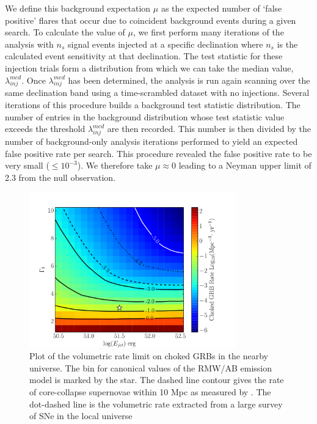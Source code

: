 \documentclass[manuscript]{aastex}
\begin{document}
We define this background expectation $\mu$ as the expected number of `false positive' flares that occur due to coincident background events during a given search. To calculate the value of $\mu$, we first perform many iterations of the analysis with $n_s$ signal events injected at a specific declination where $n_s$ is the calculated event sensitivity at that declination. The test statistic for these injection trials form a distribution from which we can take the median value, $\lambda_{inj}^{med}$. Once $\lambda_{inj}^{med}$ has been determined, the analysis is run again scanning over the same declination band using a time-scrambled dataset with no injections. Several iterations of this procedure builds a background test statistic distribution. The number of entries in the background distribution whose test statistic value exceeds the threshold $\lambda_{inj}^{med}$ are then recorded. This number is then divided by the number of background-only analysis iterations performed to yield an expected false positive rate per search. This procedure revealed the false positive rate to be very small ($\leq 10^{-3}$). We therefore take $\mu\approx0$ leading to a Neyman upper limit of 2.3 from the null observation.
\begin{figure}[ht]
  \begin{center}
    \includegraphics[width=0.8\textwidth,keepaspectratio]{plots/RateLimit_2DHisto_wContours_SysAdjusted.pdf}
  \end{center}
  \caption[Choked GRB Volumetric Rate Limit]{Plot of the volumetric rate limit on choked GRBs in the nearby universe. The bin for canonical values of the RMW/AB emission model is marked by the star. The dashed line contour gives the rate of core-collapse supernovae within 10 Mpc as measured by \cite{2011PhRvD..83l3008K}. The dot-dashed line is the volumetric rate extracted from a large survey of SNe in the local universe \citep{2011MNRAS.412.1419L}}
  \label{fig:VolumetricRateSensitivity}
\end{figure}
\end{document}
